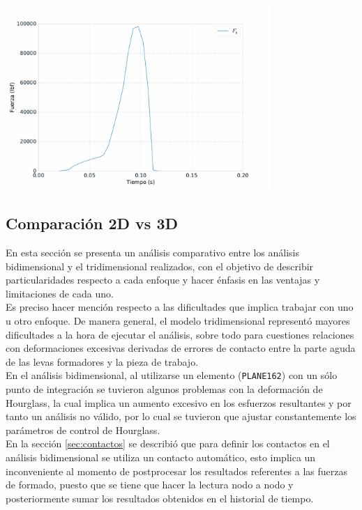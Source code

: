 \begin{center}
\includegraphics[width=0.75\textwidth]{src/ch4/fuerza_formado_3d_02.pdf}
\label{fig:fuerza_formado_3d_02}
\end{center}

\subsection{Comparación 2D vs 3D}

En esta sección se presenta un análisis comparativo entre los análisis bidimensional 
y el tridimensional realizados, con el objetivo de describir particularidades respecto 
a cada enfoque y hacer énfasis en las ventajas y limitaciones de cada uno.  \\

Es preciso hacer mención respecto a las dificultades que implica trabajar con uno u 
otro enfoque. De manera general, el modelo tridimensional representó mayores dificultades 
a la hora de ejecutar el análisis, sobre todo para cuestiones relaciones con deformaciones 
excesivas derivadas de errores de contacto entre la parte aguda de las levas formadores 
y la pieza de trabajo.\\

En el análisis bidimensional, al utilizarse un elemento (\texttt{PLANE162}) con un sólo punto 
de integración se tuvieron algunos problemas con la deformación de Hourglass, la cual implica 
un aumento excesivo en los esfuerzos resultantes y por tanto un análisis no válido, por 
lo cual se tuvieron que ajustar constantemente los parámetros de control de Hourglass.\\

En la sección \ref{sec:contactos} se describió que para definir los contactos en el 
análisis bidimensional se utiliza un contacto automático, esto implica un inconveniente 
al momento de postprocesar los resultados referentes a las fuerzas de formado, puesto 
que se tiene que hacer la lectura nodo a nodo y posteriormente sumar los resultados 
obtenidos en el historial de tiempo.

